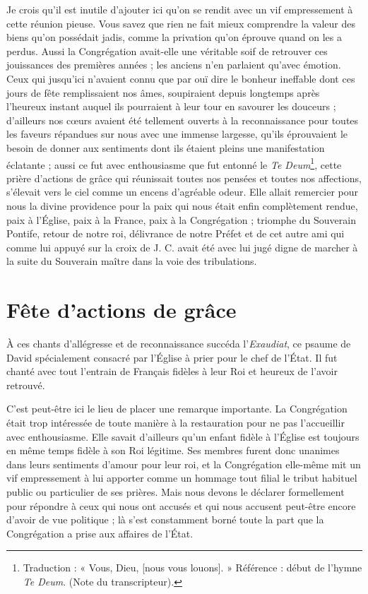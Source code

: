 Je crois qu'il est inutile d'ajouter ici qu'on se rendit avec un vif empressement à cette réunion pieuse. Vous savez que rien ne fait mieux comprendre la valeur des biens qu'on possédait jadis, comme la privation qu'on éprouve quand on les a perdus. Aussi la Congrégation avait-elle
une véritable soif de retrouver ces jouissances des premières années ; les anciens n'en parlaient qu'avec émotion. Ceux qui jusqu'ici n'avaient connu que par ouï dire le bonheur ineffable dont ces jours de fête remplissaient nos âmes, soupiraient depuis longtemps après l'heureux instant auquel ils pourraient à leur tour en savourer les douceurs ; d'ailleurs nos cœurs avaient été tellement ouverts à la reconnaissance pour toutes les faveurs répandues sur nous avec une immense largesse, qu'ils éprouvaient le besoin de donner aux sentiments dont ils étaient pleins une manifestation éclatante ; aussi ce fut avec enthousiasme que fut entonné le \textit{Te Deum}\footnote{Traduction : « Vous, Dieu, [nous vous louons]. » Référence : début de l’hymne \textit{Te Deum}. (Note du transcripteur).}, cette prière d'actions de grâce qui réunissait toutes nos pensées et toutes nos affections, s'élevait vers le ciel comme un encens d'agréable odeur. Elle allait remercier pour nous la divine providence pour la paix qui nous était enfin complètement rendue, paix à l'Église, paix à la France, paix à la Congrégation ; triomphe du Souverain Pontife, retour de notre roi, délivrance de notre Préfet et de cet autre ami qui comme lui appuyé sur la croix de J. C. avait été avec lui jugé digne de marcher à la suite du Souverain maître dans la voie des tribulations.

\section*{Fête d'actions de grâce}
À ces chants d'allégresse et de reconnaissance succéda l'\textit{Exaudiat}, ce psaume de David spécialement consacré par l'Église à prier pour le chef de l'État. Il fut chanté avec tout l'entrain de Français fidèles à leur Roi et heureux de l'avoir retrouvé.

C'est peut-être ici le lieu de placer une remarque importante. La Congrégation était trop intéressée de toute manière à la
restauration pour ne pas l'accueillir avec enthousiasme. Elle savait d'ailleurs qu'un enfant fidèle à l'Église est toujours en même temps fidèle à son Roi légitime. Ses membres furent donc unanimes dans leurs sentiments d'amour pour leur roi, et la Congrégation elle-même mit un vif empressement à lui apporter comme un hommage tout filial le tribut habituel public ou particulier de ses prières. Mais nous devons le déclarer formellement pour répondre à ceux qui nous ont accusés et qui nous accusent peut-être encore d'avoir de vue politique ; là s'est constamment borné toute la part que la Congrégation a prise aux affaires de l'État.

